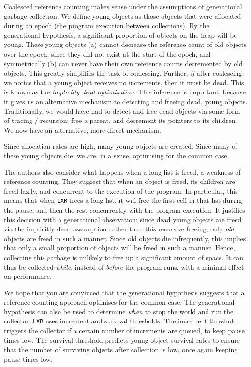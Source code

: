 Coalesced reference counting makes sense under the assumptions of generational garbage collection. We define young objects as those objects that were allocated during an epoch (the program execution between collections). By the generational hypothesis, a significant proportion of objects on the heap will be young. These young objects (a) cannot decrease the reference count of old objects over the epoch, since they did not exist at the start of the epoch, and symmetrically (b) can never have their own reference counts decremented by old objects. This greatly simplifies the task of coalescing. Further, \textit{if} after coalescing, we notice that a young object receives no increments, then it must be dead. This is known as the \textit{implicitly dead optimisation}. This inference is important, because it gives us an alternative mechanism to detecting and freeing dead, young objects. Traditionally, we would have had to detect and free dead objects via some form of tracing / recursion: free a parent, and decrement its pointers to its children. We now have an alternative, more direct mechanism. 

Since allocation rates are high, many young objects are created. Since many of these young objects die, we are, in a sense, optimising for the common case. 

The authors also consider what happens when a long list is freed, a weakness of reference counting. They suggest that when an object is freed, its children are freed lazily, and concurrent to the execution of the program. In particular, this means that when \texttt{LXR} frees a long list, it will free the first cell in that list during the pause, and then the rest concurrently with the program execution. It justifies this decision with a generational observation: since dead young objects are freed via the implicitly dead assumption rather than this recursive freeing, only \textit{old} objects are freed in such a manner. Since old objects die infrequently, this implies that only a small proportion of objects will be freed in such a manner. Hence, collecting this garbage is unlikely to free up a significant amount of space. It can thus be collected \textit{while}, instead of \textit{before} the program runs, with a minimal effect on performance.

We hope that you are convinced that the generational hypothesis suggests that a reference counting approach optimises for the common case. The generational hypothesis can also be used to determine \textit{when} to stop the world and run the collector: \texttt{LXR} uses increment and survival thresholds. The increment threshold triggers the collector if a certain number of increments are queued, to keep pause times low. The survival threshold predicts young object survival rates to ensure that the number of surviving objects after collection is low, once again keeping pause times low.

